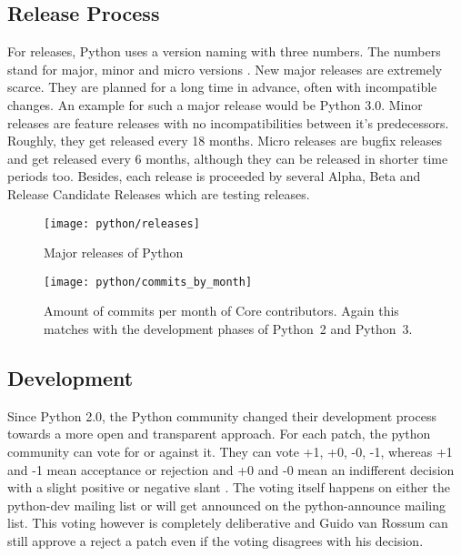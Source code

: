 
\subsection{Release Process} %

For releases, Python uses a version naming with three numbers. The numbers
stand for major, minor and micro versions
\cite{PythonDevelopmentCycle,Warsaw2001}. New major releases are extremely
scarce. They are planned for a long time in advance, often with incompatible
changes. An example for such a major release would be Python 3.0. Minor
releases are feature releases with no incompatibilities between it's
predecessors. Roughly, they get released every 18 months. Micro releases are
bugfix releases and get released every 6 months, although they can be released
in shorter time periods too. Besides, each release is proceeded by several
Alpha, Beta and Release Candidate Releases which are testing releases.

\begin{figure}[htbp]
  \centering
  \texttt{[image: python/releases]}
  \caption{Major releases of Python}
\end{figure}

\begin{figure}[htbp]
  \centering
  \texttt{[image: python/commits\_by\_month]}
  \caption{Amount of commits per month of Core contributors. Again this matches
  with the development phases of Python~2 and Python~3.}
\end{figure}


\subsection{Development} %

Since Python 2.0, the Python community changed their development process
towards a more open and transparent approach. For each patch, the python
community can vote for or against it. They can vote +1, +0, -0, -1, whereas +1
and -1 mean acceptance or rejection and +0 and -0 mean an indifferent decision
with a slight positive or negative slant \cite{Warsaw2002}. The voting itself
happens on either the python-dev mailing list or will get announced on the
python-announce mailing list. This voting however is completely deliberative
and Guido van Rossum can still approve a reject a patch even if the voting
disagrees with his decision.

